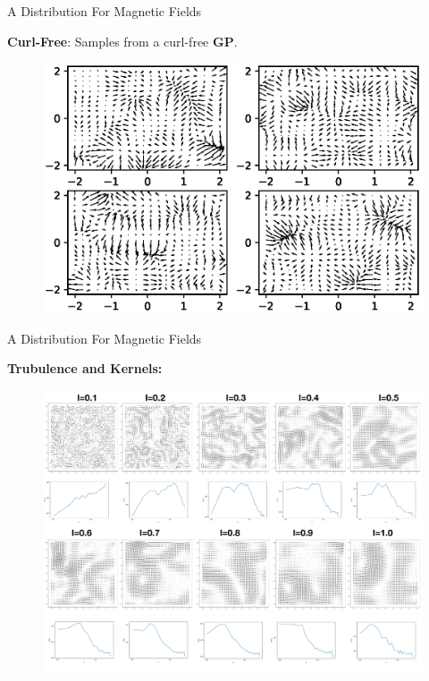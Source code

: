 \documentclass{beamer}
\begin{document}
\begin{frame}{A Distribution For Magnetic Fields}

  \textbf{Curl-Free}: Samples from a curl-free \textbf{GP}.

  \begin{figure}
    \includegraphics[width=\linewidth]{plots/curl_free.eps}
  \end{figure}

\end{frame}


\begin{frame}{A Distribution For Magnetic Fields}

  \textbf{Trubulence and Kernels:}

  \begin{figure}
    \includegraphics[width=0.9\linewidth]{plots/Power_Spectra.pdf}
  \end{figure}

\end{frame}
\end{document}
